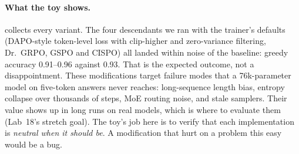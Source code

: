 \paragraph{What the toy shows.}  collects every variant. The four
descendants we ran with the trainer's defaults (DAPO-style token-level loss with clip-higher
and zero-variance filtering, Dr.~GRPO, GSPO and CISPO) all landed within noise of the
baseline: greedy accuracy 0.91--0.96 against 0.93. That is the expected outcome, not a
disappointment. These modifications target failure modes that a 76k-parameter model on
five-token answers never reaches: long-sequence length bias, entropy collapse over thousands
of steps, MoE routing noise, and stale samplers. Their value shows up in long runs on real
models, which is where to evaluate them (Lab~18's stretch goal). The toy's job here is to
verify that each implementation is \emph{neutral when it should be}. A modification that hurt
on a problem this easy would be a bug.

